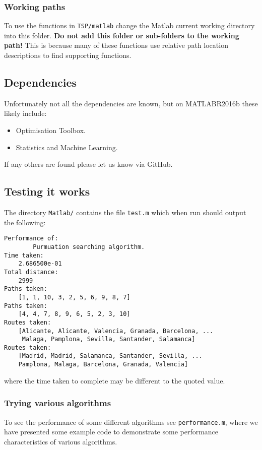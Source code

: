 \subsubsection{Working paths}
\label{subsubsec:working_paths}

To use the functions in \texttt{TSP/matlab} change the Matlab current working directory into this folder. \textbf{Do not add this folder or sub-folders to the working path!} This is because many of these functions use relative path location descriptions to find supporting functions. 

\subsection{Dependencies}
\label{subsec:dependencies}

Unfortunately not all the dependencies are known, but on MATLABR2016b these likely include:
\begin{itemize}
	\item Optimisation Toolbox.
	\item Statistics and Machine Learning.
\end{itemize}
If any others are found please let us know via GitHub.


\subsection{Testing it works}
\label{subsec:testing_it_works}

The directory \texttt{Matlab/} contains the file \verb|test.m| which when run should output the following: \\
\noindent
\begin{verbatim}
Performance of:
        Purmuation searching algorithm.
Time taken:
    2.686500e-01
Total distance:
    2999
Paths taken:
    [1, 1, 10, 3, 2, 5, 6, 9, 8, 7]
Paths taken:
    [4, 4, 7, 8, 9, 6, 5, 2, 3, 10]
Routes taken:
    [Alicante, Alicante, Valencia, Granada, Barcelona, ...
     Malaga, Pamplona, Sevilla, Santander, Salamanca]
Routes taken:
    [Madrid, Madrid, Salamanca, Santander, Sevilla, ...
    Pamplona, Malaga, Barcelona, Granada, Valencia]
\end{verbatim}
where the time taken to complete may be different to the quoted value. 

\subsubsection{Trying various algorithms}
\label{subsubsec:trying_various_algorithms}

To see the performance of some different algorithms see \verb|performance.m|, where we have presented some example code to demonstrate some performance characteristics of various algorithms.

\clearpage
